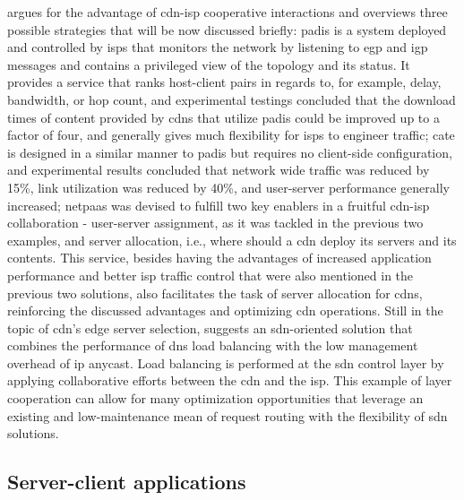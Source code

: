     \cite{cdn-isp-cooperations} argues for the advantage of \gls{cdn}-\gls{isp} cooperative interactions and overviews three possible strategies that will be now discussed briefly: \gls{padis} \cite{pfa-10} is a system deployed and controlled by \glspl{isp} that monitors the network by listening to \gls{egp} and \gls{igp} messages and contains a privileged view of the topology and its status.
    It provides a service that ranks host-client pairs in regards to, for example, delay, bandwidth, or hop count, and experimental testings concluded that the download times of content provided by \glspl{cdn} that utilize \gls{padis} could be improved up to a factor of four, and generally gives much flexibility for \glspl{isp} to engineer traffic; \gls{cate}  \cite{fps-12} is designed in a similar manner to \gls{padis} but requires no client-side configuration, and experimental results concluded that network wide traffic was reduced by 15\%, link utilization was reduced by 40\%, and user-server performance generally increased; \gls{netpaas} \cite{pushing-cdn-isp-collaboration} was devised to fulfill two key enablers in a fruitful \gls{cdn}-\gls{isp} collaboration - user-server assignment, as it was tackled in the previous two examples, and server allocation, i.e., where should a \gls{cdn} deploy its servers and its contents.
    This service, besides having the advantages of increased application performance and better \gls{isp} traffic control that were also mentioned in the previous two solutions, also facilitates the task of server allocation for \glspl{cdn}, reinforcing the discussed advantages and optimizing \gls{cdn} operations.
    Still in the topic of \gls{cdn}'s edge server selection, \cite{wichtlhuber2017} suggests an \gls{sdn}-oriented solution that combines the performance of \gls{dns} load balancing with the low management overhead of \gls{ip} anycast.
    Load balancing is performed at the \gls{sdn} control layer by applying collaborative efforts between the \gls{cdn} and the \gls{isp}.
    This example of layer cooperation can allow for many optimization opportunities that leverage an existing and low-maintenance mean of request routing with the flexibility of \gls{sdn} solutions.

\subsection{Server-client applications}

